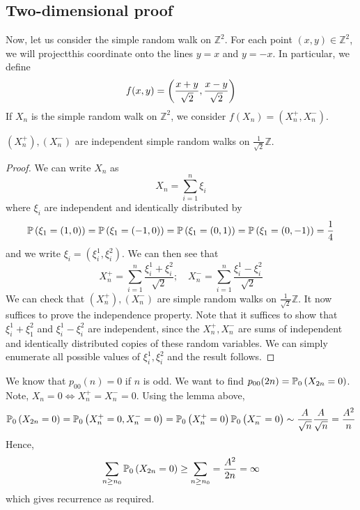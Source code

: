 \subsection{Two-dimensional proof}
Now, let us consider the simple random walk on \( \mathbb Z^2 \).
For each point \( (x,y) \in \mathbb Z^2 \), we will projectthis coordinate onto the lines \( y=x \) and \( y=-x \).
In particular, we define
\[
	f(x,y) = \qty(\frac{x+y}{\sqrt{2}}, \frac{x-y}{\sqrt{2}})
\]
If \( X_n \) is the simple random walk on \( \mathbb Z^2 \), we consider \( f(X_n) = (X_n^+, X_n^-) \).
\begin{lemma}
	\( (X_n^+), (X_n^-) \) are independent simple random walks on \( \frac{1}{\sqrt{2}} \mathbb Z \).
\end{lemma}
\begin{proof}
	We can write \( X_n \) as
	\[
		X_n = \sum_{i=1}^n \xi_i
	\]
	where \( \xi_i \) are independent and identically distributed by
	\[
		\mathbb{P}\left({\xi_1 = (1,0)}\right) = \mathbb{P}\left({\xi_1 = (-1,0)}\right) = \mathbb{P}\left({\xi_1 = (0,1)}\right) = \mathbb{P}\left({\xi_1 = (0,-1)}\right) = \frac{1}{4}
	\]
	and we write \( \xi_i = (\xi_i^1, \xi_i^2) \).
	We can then see that
	\[
		X_n^+ = \sum_{i=1}^n \frac{\xi_i^1 + \xi_i^2}{\sqrt{2}};\quad X_n^- = \sum_{i=1}^n \frac{\xi_i^1 - \xi_i^2}{\sqrt{2}}
	\]
	We can check that \( (X_n^+), (X_n^-) \) are simple random walks on \( \frac{1}{\sqrt{2}} \mathbb Z \).
	It now suffices to prove the independence property.
	Note that it suffices to show that \( \xi_i^1 + \xi_1^2 \) and \( \xi_i^1 - \xi_i^2 \) are independent, since the \( X_n^+, X_n^- \) are sums of independent and identically distributed copies of these random variables.
	We can simply enumerate all possible values of \( \xi_i^1, \xi_i^2 \) and the result follows.
\end{proof}
We know that \( p_{00}(n) = 0 \) if \( n \) is odd.
We want to find \( p_{00}(2n) = \mathbb{P}_{0}\left({X_{2n} = 0}\right) \).
Note, \( X_n = 0 \iff X_n^+ = X_n^- = 0 \).
Using the lemma above,
\[
	\mathbb{P}_{0}\left({X_{2n} = 0}\right) = \mathbb{P}_{0}\left({X_n^+ = 0, X_n^- = 0}\right) = \mathbb{P}_{0}\left({X_n^+ = 0}\right) \mathbb{P}_{0}\left({X_n^- = 0}\right) \sim \frac{A}{\sqrt{n}} \frac{A}{\sqrt{n}} = \frac{A^2}{n}
\]
Hence,
\[
	\sum_{n \geq n_0} \mathbb{P}_{0}\left({X_{2n} = 0}\right) \geq \sum_{n \geq n_0} = \frac{A^2}{2n} = \infty
\]
which gives recurrence as required.

